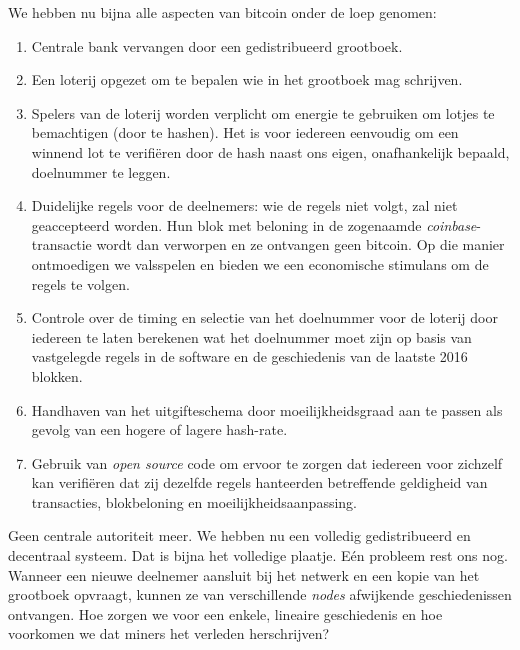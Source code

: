 We hebben nu bijna alle aspecten van bitcoin onder de loep genomen:

\begin{enumerate}
\item Centrale bank vervangen door een gedistribueerd grootboek.
\item Een loterij opgezet om te bepalen wie in het grootboek mag schrijven.
\item Spelers van de loterij worden verplicht om energie te gebruiken om lotjes te bemachtigen (door te hashen). Het is voor iedereen eenvoudig om een winnend lot te verifiëren door de hash naast ons eigen, onafhankelijk bepaald, doelnummer te leggen.
\item Duidelijke regels voor de deelnemers: wie de regels niet volgt, zal niet geaccepteerd worden. Hun blok met beloning in de zogenaamde \textit{coinbase}-transactie wordt dan verworpen en ze ontvangen geen bitcoin. Op die manier ontmoedigen we valsspelen en bieden we een economische stimulans om de regels te volgen.
\item Controle over de timing en selectie van het doelnummer voor de loterij door iedereen te laten berekenen wat het doelnummer moet zijn op basis van vastgelegde regels in de software en de geschiedenis van de laatste 2016 blokken.
\item Handhaven van het uitgifteschema door moeilijkheidsgraad aan te passen als gevolg van een hogere of lagere hash-rate.
\item Gebruik van \textit{open source} code om ervoor te zorgen dat iedereen voor zichzelf kan verifiëren dat zij dezelfde regels hanteerden betreffende geldigheid van transacties, blokbeloning en moeilijkheidsaanpassing.
\end{enumerate}
Geen centrale autoriteit meer. We hebben nu een volledig gedistribueerd en decentraal systeem. Dat is bijna het volledige plaatje. Eén probleem rest ons nog. Wanneer een nieuwe deelnemer aansluit bij het netwerk en een kopie van het grootboek opvraagt, kunnen ze van verschillende \textit{nodes} afwijkende geschiedenissen ontvangen. Hoe zorgen we voor een enkele, lineaire geschiedenis en hoe voorkomen we dat miners het verleden herschrijven?

